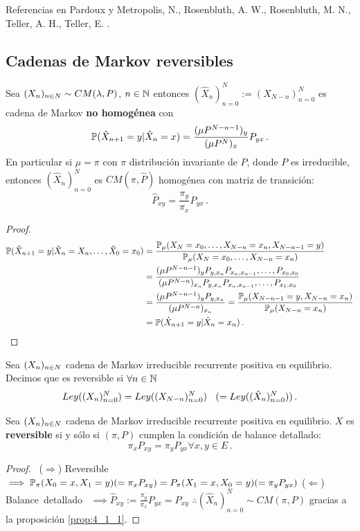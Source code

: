 Referencias en Pardoux \cite{pardoux} y Metropolis, N., Rosenbluth, A. W., Rosenbluth, M. N., Teller, A. H., Teller, E.  \cite{metro}.
\subsection{Cadenas de Markov reversibles} %
\begin{proposition}
\label{prop:4_1_1}
Sea $\xcm\sim\cm$, $n\in\N$ entonces $(\hat{X}_n)_{n=0}^N:=(X_{N-n})_{n=0}^N$ es cadena de Markov \textbf{no homogénea} con
$$ \P(\hat{X}_{n+1}=y|\hat{X}_n=x)=\displaystyle\frac{(\mu P^{N-n-1})_y}{(\mu P^N)_x}P_{yx} \, .$$
En particular si $\mu=\pi$ con $\pi$ distribución invariante de $P$, donde $P$ es irreducible, entonces $(\hat{X}_n)_{n=0}^N$ es $CM(\pi,\hat{P})$ homogénea con matriz de transición:
$$ \hat{P}_{xy}=\displaystyle\frac{\pi_y}{\pi_x}P_{yx} \, .$$
\end{proposition}
\begin{proof}
\gris
\begin{alignat*}{2}
    \P(\xhat_{n+1}=y|\xhat_{n}=X_n,\dots,\xhat_0=x_0) & = \displaystyle \frac{\P_\mu(X_N=x_0,\dots,X_{N-n}=x_n,X_{N-n-1}=y)}{\P_\mu(X_N=x_0,\dots,X_{N-n}=x_n)} \\
     & = \frac{(\mu P^{N-n-1})_yP_{y,x_n}P_{x_n,x_{n-1}},\dots,P_{x_0,x_0}}{(\mu P^{N-n})_{x_n}P_{y,x_n}P_{x_n,x_{n-1}},\dots,P_{x_1,x_0}} \\
     & =  \frac{(\mu P^{N-n-1})_yP_{y,x_n}}{(\mu P^{N-n})_{x_n}} = \frac{\P_\mu(X_{N-n-1}=y,X_{N-n}=x_n)}{\P_\mu(X_{N-n}=x_n)}\\
     & = \P(\hat{X}_{n+1}=y|\hat{X}_n=x_n) \, .
\end{alignat*}
\findem
\negro 
\end{proof}
\begin{definition}[Reversibilidad]
Sea $\xcm$ cadena de Markov irreducible recurrente positiva en equilibrio. Decimos que es reversible si $\forall n\in\N$
$$ Ley((X_n)_{n=0}^N)=Ley((X_{N-n})_{n=0}^N)\espacio(=Ley((\hat{X}_{n})_{n=0}^N)) \, .$$
\end{definition}
\begin{proposition}
Sea $\xcm$ cadena de Markov irreducible recurrente positiva en equilibrio. $X$ es \textbf{reversible} si y sólo si $(\pi,P)$ cumplen la condición de balance detallado:
$$ \pi_xP_{xy}=\pi_yP_{yx}\forall x,y\in E\, .$$
\end{proposition}
\begin{proof}
\gris
\mbox{ }\newline ($\Rightarrow$) Reversible $\implies \P_\pi(X_0=x,X_1=y)(=\pi_xP_{xy})=P_\pi(X_1=x,X_0=y)(=\pi_yP_{yx})$
\newline ($\Leftarrow$) \mbox{Balance detallado } $\implies \hat{P}_{xy}:=\displaystyle\frac{\pi_y}{\pi_x}P_{yx}=P_{xy}$
\newline $\therefore (\hat{X}_n)_{n=0}^N\sim CM(\pi,P)$ gracias a la proposición \ref{prop:4_1_1}. \findem
\negro
\end{proof}
